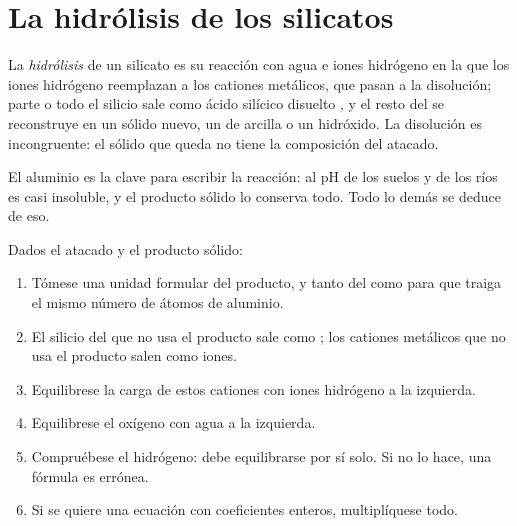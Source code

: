 \section{La hidrólisis de los silicatos}\label{sec:b1:weathering-clays:hydrolysis}

\begin{definition}\label{def:b1:weathering-clays:hydrolysis}
La \emph{hidrólisis} de un silicato es su reacción con agua e iones hidrógeno en la que los iones
hidrógeno reemplazan a los cationes metálicos, que pasan a la disolución; parte o todo el silicio sale como ácido silícico disuelto
, y el resto del  se reconstruye en un sólido nuevo, un  de arcilla o un hidróxido. La disolución es incongruente:
el sólido que queda no tiene la composición del  atacado.
\end{definition}

El aluminio es la clave para escribir la reacción: al pH de los suelos y de los ríos es casi insoluble, y el producto sólido lo conserva todo.
Todo lo demás se deduce de eso.

\begin{method}\label{met:b1:weathering-clays:balance}
Dados el  atacado y el producto sólido:
\begin{enumerate}
  \item Tómese una unidad formular del producto, y tanto del  como para que traiga el mismo número de átomos de aluminio.
  \item El silicio del  que no usa el producto sale como ; los cationes metálicos que no usa el producto salen como iones.
  \item Equilibrese la carga de estos cationes con iones hidrógeno a la izquierda.
  \item Equilibrese el oxígeno con agua a la izquierda.
  \item Compruébese el hidrógeno: debe equilibrarse por sí solo. Si no lo hace, una fórmula es errónea.
  \item Si se quiere una ecuación con coeficientes enteros, multiplíquese todo.
\end{enumerate}
\end{method}

